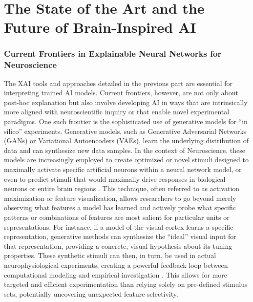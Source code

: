 \part{The State of the Art and the Future of Brain-Inspired AI}

\section{Current Frontiers in Explainable Neural Networks for Neuroscience}

The XAI tools and approaches detailed in the previous part are essential for interpreting trained AI models. Current frontiers, however, are not only about post-hoc explanation but also involve developing AI in ways that are intrinsically more aligned with neuroscientific inquiry or that enable novel experimental paradigms. One such frontier is the sophisticated use of generative models for ``in silico'' experiments. Generative models, such as Generative Adversarial Networks (GANs) or Variational Autoencoders (VAEs), learn the underlying distribution of data and can synthesize new data samples. In the context of Neuroscience, these models are increasingly employed to create optimized or novel stimuli designed to maximally activate specific artificial neurons within a neural network model, or even to predict stimuli that would maximally drive responses in biological neurons or entire brain regions \cite{olah2018building}. This technique, often referred to as activation maximization or feature visualization, allows researchers to go beyond merely observing what features a model has learned and actively probe what specific patterns or combinations of features are most salient for particular units or representations. For instance, if a model of the visual cortex learns a specific representation, generative methods can synthesize the ``ideal'' visual input for that representation, providing a concrete, visual hypothesis about its tuning properties. These synthetic stimuli can then, in turn, be used in actual neurophysiological experiments, creating a powerful feedback loop between computational modeling and empirical investigation \cite{richards2019deep, kriegeskorte2018cognitive}. This allows for more targeted and efficient experimentation than relying solely on pre-defined stimulus sets, potentially uncovering unexpected feature selectivity.

